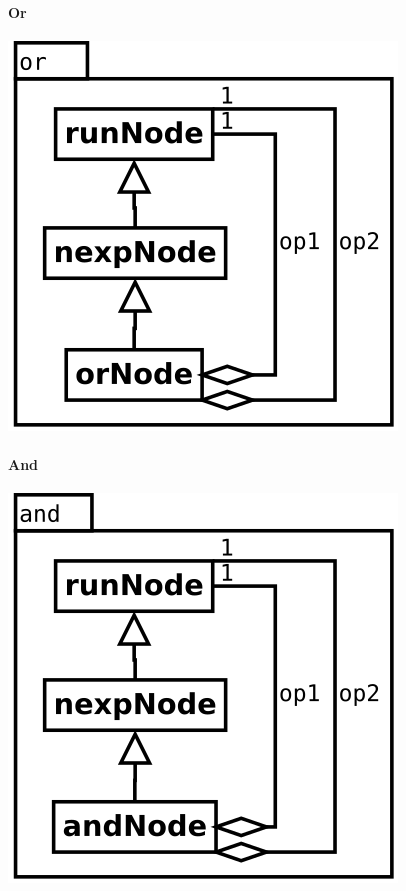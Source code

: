 \paragraph {Or}
\begin{center}
\includegraphics[scale=0.4]{or.png} \\
\end{center}

\paragraph {And}
\begin{center}
\includegraphics[scale=0.4]{and.png} \\
\end{center}


